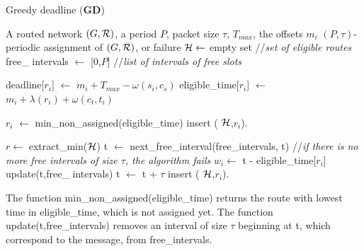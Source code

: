 \documentclass[10pt, conference, letterpaper]{IEEEtran}
\begin{document}
     
      \begin{algorithm}
     \caption{ Greedy deadline ({\bf GD}) }
     \begin{algorithmic}
     \REQUIRE A routed network $(G,{\cal R})$, a period $P$, packet size $\tau$, $ T_{max}$, the offsets $m_i$
     \ENSURE $(P,\tau)$-periodic assignment of $(G,{\cal R})$, or failure
    \STATE  ${\cal H} \leftarrow$ empty set //{\em set of eligible routes}
        \STATE  free\_ intervals $\leftarrow$ [0,$P$] //{\em list of intervals of free slots}
   
     \STATE  deadline[$r_i$]  $\leftarrow$  $m_{i} + T_{max} - \omega(s_i,c_s)$
     \STATE  eligible\_time[$r_i$] $\leftarrow$ $m_{i} +  \lambda(r_i) + \omega(c_t,t_i)$
       \ENDFOR
       
       \STATE $r_i$ $\leftarrow $ min\_non\_assigned(eligible\_time)
       \STATE insert ( ${\cal H}$,$r_i$).
       \ENDIF
      
       \STATE $r \leftarrow $ extract\_min(${\cal H}$)
       \STATE t $\leftarrow$ next\_free\_interval(free\_intervals, t) //{\em if there is no more free intervals of size $\tau$, the algorithm fails}
       \STATE $w_i \leftarrow$ t - eligible\_time[$r_i$]
       \STATE update(t,free\_ intervals)
       \STATE t $\leftarrow$ t + $\tau$
 \STATE insert ( ${\cal H}$,$r_i$).
       \ENDFOR
       \ENDWHILE

     
 
     \end{algorithmic}
     \end{algorithm}
     The function  min\_non\_assigned(eligible\_time) returns the route with lowest time in eligible\_time, which is not assigned yet. The function update(t,free\_intervals) removes an interval of size $\tau$ beginning at t, which correspond to the message,  from free\_intervals.
\end{document}
